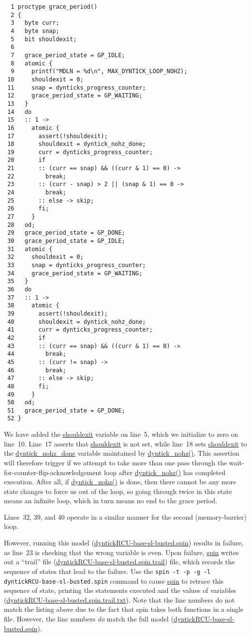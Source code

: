 { \scriptsize
\begin{verbatim}
  1 proctype grace_period()
  2 {
  3   byte curr;
  4   byte snap;
  5   bit shouldexit;
  6 
  7   grace_period_state = GP_IDLE;
  8   atomic {
  9     printf("MDLN = %d\n", MAX_DYNTICK_LOOP_NOHZ);
 10     shouldexit = 0;
 11     snap = dynticks_progress_counter;
 12     grace_period_state = GP_WAITING;
 13   }
 14   do
 15   :: 1 ->
 16     atomic {
 17       assert(!shouldexit);
 18       shouldexit = dyntick_nohz_done;
 19       curr = dynticks_progress_counter;
 20       if
 21       :: (curr == snap) && ((curr & 1) == 0) ->
 22         break;
 23       :: (curr - snap) > 2 || (snap & 1) == 0 ->
 24         break;
 25       :: else -> skip;
 26       fi;
 27     }
 28   od;
 29   grace_period_state = GP_DONE;
 30   grace_period_state = GP_IDLE;
 31   atomic {
 32     shouldexit = 0;
 33     snap = dynticks_progress_counter;
 34     grace_period_state = GP_WAITING;
 35   }
 36   do
 37   :: 1 ->
 38     atomic {
 39       assert(!shouldexit);
 40       shouldexit = dyntick_nohz_done;
 41       curr = dynticks_progress_counter;
 42       if
 43       :: (curr == snap) && ((curr & 1) == 0) ->
 44         break;
 45       :: (curr != snap) ->
 46         break;
 47       :: else -> skip;
 48       fi;
 49     }
 50   od;
 51   grace_period_state = GP_DONE;
 52 }
\end{verbatim}
}

We have added the \url{shouldexit} variable on line~5,
which we initialize to zero on line~10.
Line~17 asserts that \url{shouldexit} is not set, while
line~18 sets \url{shouldexit} to the \url{dyntick_nohz_done}
variable maintained by \url{dyntick_nohz()}.
This assertion will therefore trigger if we attempt to take more than
one pass through the wait-for-counter-flip-acknowledgement
loop after \url{dyntick_nohz()} has completed
execution.
After all, if \url{dyntick_nohz()} is done, then there cannot be
any more state changes to force us out of the loop, so going through twice
in this state means an infinite loop, which in turn means no end to the
grace period.

Lines~32, 39, and 40 operate in a similar manner for the
second (memory-barrier) loop.

However, running this
model (\url{dyntickRCU-base-sl-busted.spin})
results in failure, as line~23 is checking that the wrong variable
is even.
Upon failure, \url{spin} writes out a
``trail'' file
(\url{dyntickRCU-base-sl-busted.spin.trail})
file, which records the sequence of states that lead to the failure.
Use the {\tt spin -t -p -g -l dyntickRCU-base-sl-busted.spin}
command to cause \url{spin} to retrace this sequence of state,
printing the statements executed and the values of variables
(\url{dyntickRCU-base-sl-busted.spin.trail.txt}).
Note that the line numbers do not match the listing above due to
the fact that spin takes both functions in a single file.
However, the line numbers \emph{do} match the full
model (\url{dyntickRCU-base-sl-busted.spin}).

